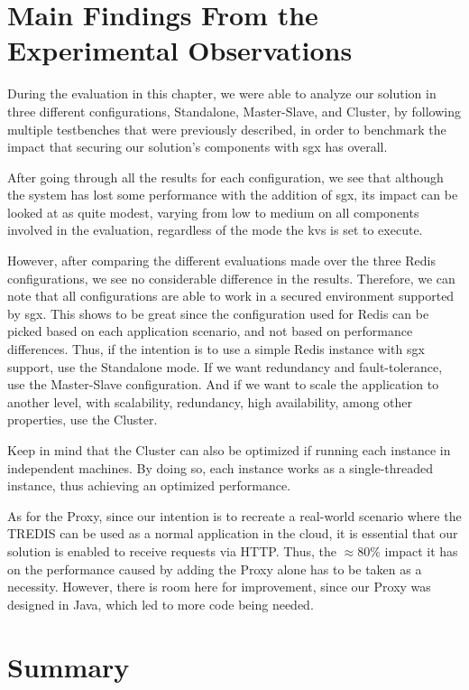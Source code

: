 \section{Main Findings From the Experimental Observations}

During the evaluation in this chapter, we were able to analyze our solution in three different configurations, Standalone, Master-Slave, and Cluster, by following multiple testbenches that were previously described, in order to benchmark the impact that securing our solution's components with \gls{sgx} has overall. 

After going through all the results for each configuration, we see that although the system has lost some performance with the addition of \gls{sgx}, its impact can be looked at as quite modest, varying from low to medium on all components involved in the evaluation, regardless of the mode the \gls{kvs} is set to execute. 

However, after comparing the different evaluations made over the three Redis configurations, we see no considerable difference in the results. Therefore, we can note that all configurations are able to work in a secured environment supported by \gls{sgx}. This shows to be great since the configuration used for Redis can be picked based on each application scenario, and not based on performance differences. Thus, if the intention is to use a simple Redis instance with \gls{sgx} support, use the Standalone mode. If we want redundancy and fault-tolerance, use the Master-Slave configuration. And if we want to scale the application to another level, with scalability, redundancy, high availability, among other properties, use the Cluster.

Keep in mind that the Cluster can also be optimized if running each instance in independent machines. By doing so, each instance works as a single-threaded instance, thus achieving an optimized performance.

As for the Proxy, since our intention is to recreate a real-world scenario where the TREDIS can be used as a normal application in the cloud, it is essential that our solution is enabled to receive requests via HTTP. Thus, the $\approx$80\% impact it has on the performance caused by adding the Proxy alone has to be taken as a necessity. However, there is room here for improvement, since our Proxy was designed in Java, which led to more code being needed. 

\section{Summary}

